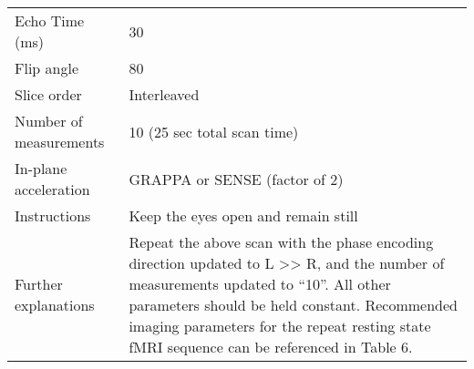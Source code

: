 \begin{table}[H]
\begin{tabularx}{\linewidth}{@{} s | X @{}}
Echo Time (ms)                                                                        & 30                                          \\
Flip angle                                                                                 	& 80                                          \\
Slice order 									& Interleaved                                 \\
Number of measurements                                                  & 10 (25 sec total scan time)                 \\
In-plane acceleration                                                             & GRAPPA or SENSE (factor of 2)               \\
Instructions									& Keep the eyes open and remain still         \\
Further explanations                                                             & Repeat the above scan with the phase encoding direction updated to L >> R, and the number of measurements updated to “10”. All other parameters should be held constant. Recommended imaging parameters for the repeat resting state fMRI sequence can be referenced in Table 6.                                            \\
\bottomrule
\end{tabularx}
\end{table}

